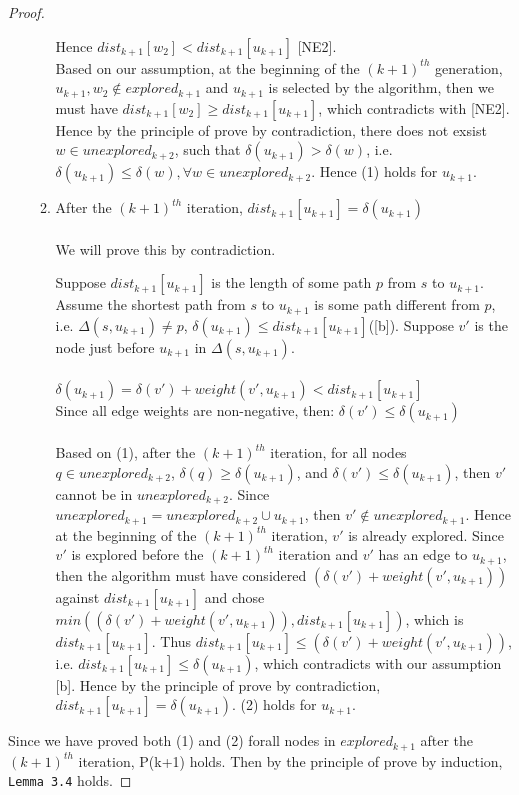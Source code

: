 \documentclass[11pt, oneside]{article}   	%
\newcommand\tab[1][1cm]{\hspace*{#1}}
\newcommand\ftab[1][5cm]{\hspace*{#1}}
\theoremstyle{definition}
\begin{document}
\begin{proof}
\begin{itemize}
\begin{enumerate}
  Hence $dist_{k+1}[w_2] < dist_{k+1}[u_{k+1}]$ [NE2]. 
  \\
  Based on our assumption, at the beginning of the $(k+1)^{th}$ generation, $u_{k+1}, w_2 \notin explored_{k+1}$ and $u_{k+1}$ is selected by the algorithm, then we must have $dist_{k+1}[w_2] \geq dist_{k+1}[u_{k+1}]$, which contradicts with [NE2]. Hence by the principle of prove by contradiction, there does not exsist $w \in unexplored_{k+2}$, such that $\delta(u_{k+1}) > \delta(w)$, i.e. $\delta(u_{k+1}) \leq \delta(w), \forall w \in unexplored_{k+2}$. Hence (1) holds for $u_{k+1}$. 
  \\



  \item After the $(k+1)^{th}$ iteration, $dist_{k+1}[u_{k+1}] = \delta(u_{k+1})$
  \\\\
  We will prove this by contradiction. 

  Suppose $dist_{k+1}[u_{k+1}]$ is the length of some path $p$ from $s$ to $u_{k+1}$. Assume the shortest path from $s$ to $u_{k+1}$ is some path different from $p$, i.e. $\Delta(s, u_{k+1}) \neq p$, $\delta(u_{k+1}) \leq dist_{k+1}[u_{k+1}]$([b]). Suppose $v'$ is the node just before $u_{k+1}$ in $\Delta(s, u_{k+1})$. 
  \\\\
  \ftab $\delta(u_{k+1}) = \delta(v') + weight(v', u_{k+1}) < dist_{k+1}[u_{k+1}]$ \\
  \tab\tab\tab Since all edge weights are non-negative, then: $\delta(v') \leq \delta(u_{k+1})$
  \\\\
  Based on (1), after the $(k+1)^{th}$ iteration, for all nodes $q \in unexplored_{k+2}$, $\delta(q) \geq \delta(u_{k+1})$, and $\delta(v') \leq \delta(u_{k+1})$, then $v'$ cannot be in $unexplored_{k+2}$. Since $unexplored_{k+1} = unexplored_{k+2} \cup u_{k+1}$, then $v' \notin unexplored_{k+1}$. Hence at the beginning of the $(k+1)^{th}$ iteration, $v'$ is already explored. Since $v'$ is explored before the $(k+1)^{th}$ iteration and $v'$ has an edge to $u_{k+1}$, then the algorithm must have considered $(\delta(v') + weight(v', u_{k+1}))$ against $dist_{k+1}[u_{k+1}]$ and chose $min((\delta(v') + weight(v', u_{k+1})), dist_{k+1}[u_{k+1}])$, which is $dist_{k+1}[u_{k+1}]$. Thus $dist_{k+1}[u_{k+1}] \leq (\delta(v') + weight(v', u_{k+1}))$, i.e. $dist_{k+1}[u_{k+1}] \leq \delta(u_{k+1})$, which contradicts with our assumption [b]. Hence by the principle of prove by contradiction, $dist_{k+1}[u_{k+1}] = \delta(u_{k+1})$. (2) holds for $u_{k+1}$. 
  \end{enumerate}
\end{itemize}
Since we have proved both (1) and (2) forall nodes in $explored_{k+1}$ after the $(k+1)^{th}$ iteration, P(k+1) holds. Then by the principle of prove by induction, \texttt{Lemma 3.4} holds. 
\end{proof}
\end{document}
